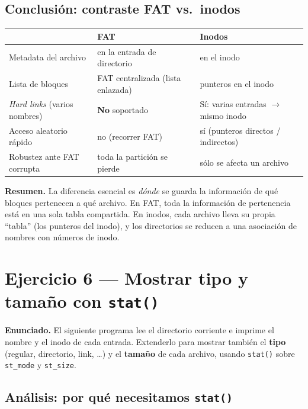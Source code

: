 \documentclass[11pt,a4paper]{article}
\begin{document}
\subsection*{Conclusión: contraste FAT vs.\ inodos}

\begin{center}
\small
\begin{tabular}{@{}lll@{}}
\toprule
 & \textbf{FAT} & \textbf{Inodos} \\
\midrule
Metadata del archivo & en la entrada de directorio  & en el inodo \\
Lista de bloques     & FAT centralizada (lista enlazada) & punteros en el inodo \\
\emph{Hard links} (varios nombres) & \textbf{No} soportado & Sí: varias entradas $\to$ mismo inodo \\
Acceso aleatorio rápido & no (recorrer FAT)        & sí (punteros directos / indirectos) \\
Robustez ante FAT corrupta & toda la partición se pierde & sólo se afecta un archivo \\
\bottomrule
\end{tabular}
\end{center}

\textbf{Resumen.} La diferencia esencial es \emph{dónde} se guarda la
información de qué bloques pertenecen a qué archivo. En FAT, toda la
información de pertenencia está en una sola tabla compartida. En
inodos, cada archivo lleva su propia ``tabla'' (los punteros del
inodo), y los directorios se reducen a una asociación de nombres con
números de inodo.

\section{Ejercicio 6 --- Mostrar tipo y tamaño con \texttt{stat()}}

\textbf{Enunciado.} El siguiente programa lee el directorio corriente
e imprime el nombre y el inodo de cada entrada. Extenderlo para
mostrar también el \textbf{tipo} (regular, directorio, link, \ldots)
y el \textbf{tamaño} de cada archivo, usando \texttt{stat()} sobre
\texttt{st\_mode} y \texttt{st\_size}.

\subsection*{Análisis: por qué necesitamos \texttt{stat()}}
\end{document}
